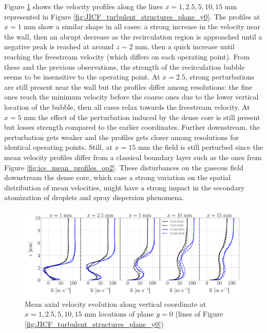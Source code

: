 Figure \ref{fig:JICF_sps_lines_y0_along_z_ux_mean} shows the velocity profiles along the lines $x = 1, 2.5, 5, 10, 15$ mm represented in Figure \ref{fig:JICF_turbulent_structures_plane_y0}. The profiles at $x = 1$ mm show a similar shape in all cases: a strong increase in the velocity near the wall, then an abrupt decrease as the recirculation region is approached until a negative peak is reached at around $z \sim 2$ mm, then a quick increase until reaching the freestream velocity (which differs on each operating point). From these and the previous observations, the strength of the recirculation bubble seems to be insensitive to the operating point. At $x = 2.5$, strong perturbations are still present near the wall but the profiles differ among resolutions: the fine ones reach the minimum velocity before the coarse ones due to the lower vertical location of the bubble, then all cases relax towards the freestream velocity. At $x = 5$ mm the effect of the perturbation induced by the dense core is still present but losses strength compared to the earlier coordinates. Further downstream, the perturbation gets weaker and the profiles gets closer among resolutions for identical operating points. Still, at $x = 15$ mm the field is still perturbed since the mean velocity profiles differ from a classical boundary layer such as the ones from Figure \ref{fig:ics_mean_profiles_op2}. These disturbances on the gaseous field downstream the dense core, which case a strong variation on the spatial distribution of mean velocities, might have a strong impact in the secondary atomization of droplets and spray dispersion phenomena.

\begin{figure}[ht]
\flushleft
   \includegraphics[scale=0.26]{./part2_developments/figures_ch5_resolved_JICF/turbulent_structures/lines_y0_along_z_ux_mean}
\caption{Mean axial velocity evolution along vertical coordinate at $x = 1, 2.5, 5, 10, 15$ mm locations of plane $y = 0$ (lines of Figure \ref{fig:JICF_turbulent_structures_plane_y0})}
\label{fig:JICF_sps_lines_y0_along_z_ux_mean}
\end{figure}




